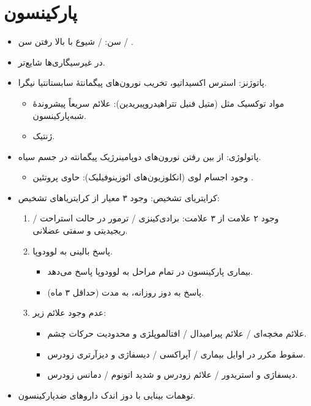 \documentclass[a4paper,12pt]{extbook}
\begin{document}
\section*{پارکینسون}
\begin{itemize}
\item سن:  / شیوع با بالا رفتن سن \MDen{$\uparrow$} / .
\item در غیرسیگاری‌ها شایع‌تر.
\item پاتوژنز: استرس اکسیداتیو، تخریب نورون‌های پیگمانتهٔ سابستانتیا نیگرا.
\begin{itemize}
\item مواد توکسیک مثل  (متیل فنیل تتراهیدروپیریدین): علائم سریعاً پیشروندهٔ شبه‌پارکینسون.
\item ژنتیک.
\end{itemize}
\item پاتولوژی: از بین رفتن نورون‌های دوپامینرژیک پیگمانته در جسم سیاه.
\begin{itemize}
\item وجود اجسام لوی (انکلوزیون‌های ائوزینوفیلیک): حاوی پروتئین .
\end{itemize}
\item کرایتریای تشخیص: وجود ۳ معیار از کرایتریاهای تشخیص:
\begin{enumerate}[label=\alph*)]
\item وجود ۲ علامت از ۳ علامت: برادی‌کینزی / ترمور در حالت استراحت / ریجیدیتی و سفتی عضلانی.
\item پاسخ بالینی به لوودوپا.
\begin{itemize}
\item بیماری پارکینسون در تمام مراحل به لوودوپا پاسخ می‌دهد.
\item پاسخ به دوز  روزانه، به مدت (حداقل ۳ ماه).
\end{itemize}
\item عدم وجود علائم زیر:
\begin{itemize}
\item علائم مخچه‌ای / علائم پیرامیدال / افتالموپلژی و محدودیت حرکات چشم.
\item سقوط مکرر در اوایل بیماری / آپراکسی / دیسفاژی و دیزآرتری زودرس.
\item دیسفاژی و استریدور / علائم زودرس و شدید اتونوم / دمانس زودرس.
\end{itemize}
\end{enumerate}
\item توهمات بینایی با دوز اندک داروهای ضدپارکینسون.
\end{itemize}
\end{document}
